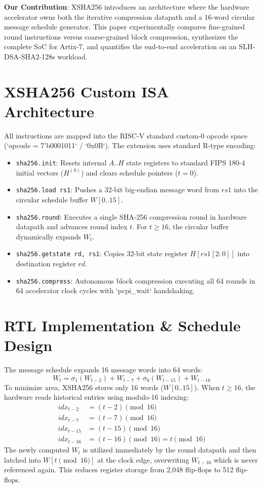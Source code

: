 \documentclass[conference]{IEEEtran}
\begin{document}
\textbf{Our Contribution}: XSHA256 introduces an architecture where the hardware accelerator owns both the iterative compression datapath and a 16-word circular message schedule generator. This paper experimentally compares fine-grained round instructions versus coarse-grained block compression, synthesizes the complete SoC for Artix-7, and quantifies the end-to-end acceleration on an SLH-DSA-SHA2-128s workload.

\section{XSHA256 Custom ISA Architecture}
All instructions are mapped into the RISC-V standard custom-0 opcode space (`opcode = 7'b0001011` / `0x0B`). The extension uses standard R-type encoding:
\begin{itemize}
    \item \texttt{sha256.init}: Resets internal $A..H$ state registers to standard FIPS 180-4 initial vectors ($H^{(0)}$) and clears schedule pointers ($t=0$).
    \item \texttt{sha256.load rs1}: Pushes a 32-bit big-endian message word from $rs1$ into the circular schedule buffer $W[0..15]$.
    \item \texttt{sha256.round}: Executes a single SHA-256 compression round in hardware datapath and advances round index $t$. For $t \ge 16$, the circular buffer dynamically expands $W_t$.
    \item \texttt{sha256.getstate rd, rs1}: Copies 32-bit state register $H[rs1[2:0]]$ into destination register $rd$.
    \item \texttt{sha256.compress}: Autonomous block compression executing all 64 rounds in 64 accelerator clock cycles with `pcpi_wait` handshaking.
\end{itemize}

\section{RTL Implementation \& Schedule Design}
The message schedule expands 16 message words into 64 words:
\begin{equation}
W_t = \sigma_1(W_{t-2}) + W_{t-7} + \sigma_0(W_{t-15}) + W_{t-16}
\end{equation}
To minimize area, XSHA256 stores only 16 words ($W[0..15]$). When $t \ge 16$, the hardware reads historical entries using modulo-16 indexing:
\begin{align*}
idx_{t-2}  &= (t - 2) \pmod{16} \\
idx_{t-7}  &= (t - 7) \pmod{16} \\
idx_{t-15} &= (t - 15) \pmod{16} \\
idx_{t-16} &= (t - 16) \pmod{16} = t \pmod{16}
\end{align*}
The newly computed $W_t$ is utilized immediately by the round datapath and then latched into $W[t \pmod{16}]$ at the clock edge, overwriting $W_{t-16}$ which is never referenced again. This reduces register storage from 2,048 flip-flops to 512 flip-flops.
\end{document}
